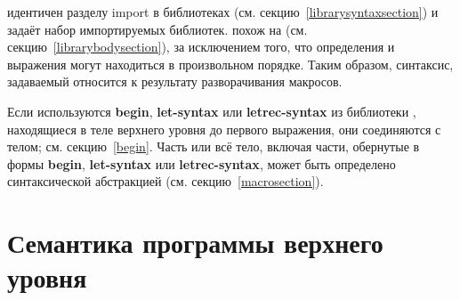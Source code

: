  идентичен разделу import в библиотеках
(см. секцию~\ref{librarysyntaxsection}) и задаёт набор импортируемых библиотек. 
похож на  (см. секцию~\ref{librarybodysection}), за исключением того, что
определения и выражения могут находиться в произвольном порядке. Таким образом, синтаксис,
задаваемый  относится к результату разворачивания макросов.

Если используются {\bfseries\cf begin}, {\bfseries\cf let-syntax} или {\bfseries\cf
  letrec-syntax} из библиотеки \textbf{}, находящиеся в теле верхнего уровня
до первого выражения, они соединяются с телом; см. секцию~\ref{begin}. Часть или всё тело,
включая части, обернутые в формы {\bfseries\cf begin}, {\bfseries\cf let-syntax} или
{\bfseries\cf letrec-syntax}, может быть определено синтаксической абстракцией
(см. секцию~\ref{macrosection}).

\section{Семантика программы верхнего уровня}\vspace{1mm}


